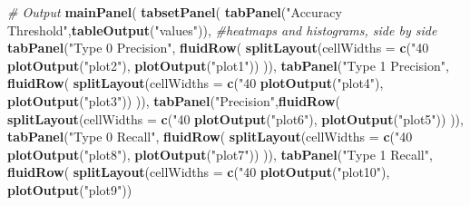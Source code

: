 \documentclass[10pt,letterpaper]{article}
\newenvironment{Shaded}{\begin{snugshade}}{\end{snugshade}}
\newcommand{\KeywordTok}[1]{\textcolor[rgb]{0.13,0.29,0.53}{\textbf{#1}}}
\newcommand{\DataTypeTok}[1]{\textcolor[rgb]{0.13,0.29,0.53}{#1}}
\newcommand{\StringTok}[1]{\textcolor[rgb]{0.31,0.60,0.02}{#1}}
\newcommand{\CommentTok}[1]{\textcolor[rgb]{0.56,0.35,0.01}{\textit{#1}}}
\newcommand{\NormalTok}[1]{#1}
\begin{document}
\begin{Shaded}
\begin{Highlighting}[]
    \CommentTok{# Output}
    \KeywordTok{mainPanel}\NormalTok{(}
      \KeywordTok{tabsetPanel}\NormalTok{(}
        \KeywordTok{tabPanel}\NormalTok{(}\StringTok{"Accuracy Threshold"}\NormalTok{,}\KeywordTok{tableOutput}\NormalTok{(}\StringTok{"values"}\NormalTok{)),}
        \CommentTok{#heatmaps and histograms, side by side}
        \KeywordTok{tabPanel}\NormalTok{(}\StringTok{"Type 0 Precision"}\NormalTok{, }\KeywordTok{fluidRow}\NormalTok{(}
          \KeywordTok{splitLayout}\NormalTok{(}\DataTypeTok{cellWidths =} \KeywordTok{c}\NormalTok{(}\StringTok{"40%
                      \KeywordTok{plotOutput}\NormalTok{(}\StringTok{"plot2"}\NormalTok{), }\KeywordTok{plotOutput}\NormalTok{(}\StringTok{"plot1"}\NormalTok{))}
\NormalTok{          )), }
        \KeywordTok{tabPanel}\NormalTok{(}\StringTok{"Type 1 Precision"}\NormalTok{, }\KeywordTok{fluidRow}\NormalTok{(}
          \KeywordTok{splitLayout}\NormalTok{(}\DataTypeTok{cellWidths =} \KeywordTok{c}\NormalTok{(}\StringTok{"40%
                      \KeywordTok{plotOutput}\NormalTok{(}\StringTok{"plot4"}\NormalTok{), }\KeywordTok{plotOutput}\NormalTok{(}\StringTok{"plot3"}\NormalTok{))}
\NormalTok{          )),}
        \KeywordTok{tabPanel}\NormalTok{(}\StringTok{"Precision"}\NormalTok{,}\KeywordTok{fluidRow}\NormalTok{(}
          \KeywordTok{splitLayout}\NormalTok{(}\DataTypeTok{cellWidths =} \KeywordTok{c}\NormalTok{(}\StringTok{"40%
                      \KeywordTok{plotOutput}\NormalTok{(}\StringTok{"plot6"}\NormalTok{), }\KeywordTok{plotOutput}\NormalTok{(}\StringTok{"plot5"}\NormalTok{))}
\NormalTok{          )),}
        \KeywordTok{tabPanel}\NormalTok{(}\StringTok{"Type 0 Recall"}\NormalTok{, }\KeywordTok{fluidRow}\NormalTok{(}
          \KeywordTok{splitLayout}\NormalTok{(}\DataTypeTok{cellWidths =} \KeywordTok{c}\NormalTok{(}\StringTok{"40%
                      \KeywordTok{plotOutput}\NormalTok{(}\StringTok{"plot8"}\NormalTok{), }\KeywordTok{plotOutput}\NormalTok{(}\StringTok{"plot7"}\NormalTok{))}
\NormalTok{        )), }
        \KeywordTok{tabPanel}\NormalTok{(}\StringTok{"Type 1 Recall"}\NormalTok{, }\KeywordTok{fluidRow}\NormalTok{(}
          \KeywordTok{splitLayout}\NormalTok{(}\DataTypeTok{cellWidths =} \KeywordTok{c}\NormalTok{(}\StringTok{"40%
                      \KeywordTok{plotOutput}\NormalTok{(}\StringTok{"plot10"}\NormalTok{), }\KeywordTok{plotOutput}\NormalTok{(}\StringTok{"plot9"}\NormalTok{))}
}}}}}
\end{Highlighting}
\end{Shaded}
\end{document}
